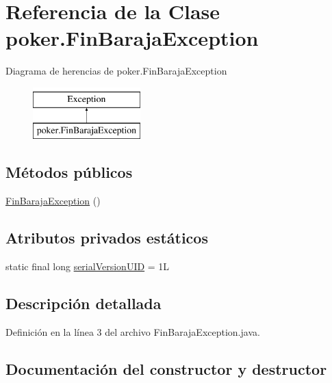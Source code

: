 \hypertarget{classpoker_1_1FinBarajaException}{}\section{Referencia de la Clase poker.\+Fin\+Baraja\+Exception}
\label{classpoker_1_1FinBarajaException}
Diagrama de herencias de poker.\+Fin\+Baraja\+Exception\begin{figure}[H]
\begin{center}
\leavevmode
\includegraphics[height=2.000000cm]{classpoker_1_1FinBarajaException}
\end{center}
\end{figure}
\subsection*{Métodos públicos}
\begin{DoxyCompactItemize}
\item 
\mbox{\hyperlink{classpoker_1_1FinBarajaException_ad894c29a2b81d94e273558eba21b02a3}{Fin\+Baraja\+Exception}} ()
\end{DoxyCompactItemize}
\subsection*{Atributos privados estáticos}
\begin{DoxyCompactItemize}
\item 
static final long \mbox{\hyperlink{classpoker_1_1FinBarajaException_a14c66e988f7a450ae98d1c31235085ca}{serial\+Version\+U\+ID}} = 1L
\end{DoxyCompactItemize}


\subsection{Descripción detallada}


Definición en la línea 3 del archivo Fin\+Baraja\+Exception.\+java.



\subsection{Documentación del constructor y destructor}
\mbox{\label{classpoker_1_1FinBarajaException_ad894c29a2b81d94e273558eba21b02a3}} 
